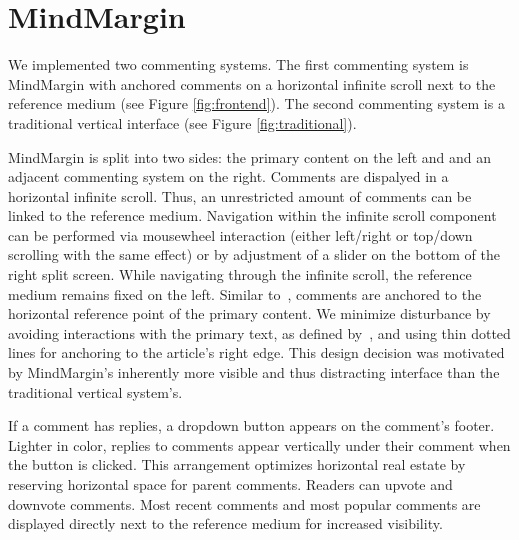 \section {MindMargin}


We implemented two commenting systems. The first commenting system is MindMargin with anchored comments on a horizontal infinite scroll next to the reference medium (see Figure \ref{fig:frontend}). The second commenting system is a traditional vertical interface (see Figure \ref{fig:traditional}). %

MindMargin is split into two sides: the primary content on the left and and an adjacent commenting system on the right. Comments are dispalyed in a horizontal infinite scroll. Thus, an unrestricted amount of comments can be linked to the reference medium. Navigation within the infinite scroll component can be performed via mousewheel interaction (either left/right or top/down scrolling with the same effect) or by adjustment of a slider on the bottom of the right split screen. While navigating through the infinite scroll, the reference medium remains fixed on the left. Similar to~\cite{FluidDocs, NB}, comments are anchored to the horizontal reference point of the primary content. We minimize disturbance by avoiding interactions with the primary text, as defined by~\cite{FluidDocs}, and using thin dotted lines for anchoring to the article's right edge. This design decision was motivated by MindMargin's inherently more visible and thus distracting interface than the traditional vertical system's. 

If a comment has replies, a dropdown button appears on the comment's footer. Lighter in color, replies to comments appear vertically under their comment when the button is clicked. This arrangement optimizes horizontal real estate by reserving horizontal space for parent comments. Readers can upvote and downvote comments. Most recent comments and most popular comments are displayed directly next to the reference medium for increased visibility.
   

